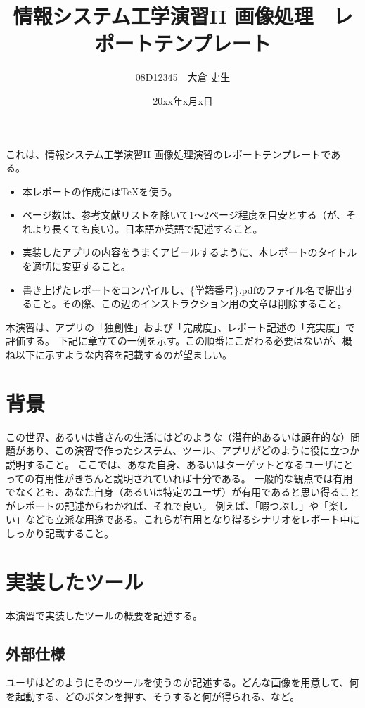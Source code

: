 \documentclass[twocolumn, a4paper]{jsarticle}
\begin{document}
\title{情報システム工学演習II 画像処理　レポートテンプレート}
\author{08D12345　大倉 史生}
\date{20xx年x月x日} 
\twocolumn[
\maketitle
]

これは、情報システム工学演習II 画像処理演習のレポートテンプレートである。
\begin{itemize}
\item 本レポートの作成には\TeX を使う。
\item ページ数は、参考文献リストを除いて1～2ページ程度を目安とする（が、それより長くても良い）。日本語か英語で記述すること。
\item 実装したアプリの内容をうまくアピールするように、本レポートのタイトルを適切に変更すること。
\item 書き上げたレポートをコンパイルし、\{学籍番号\}.pdfのファイル名で提出すること。その際、この辺のインストラクション用の文章は削除すること。
\end{itemize}
本演習は、アプリの「独創性」および「完成度」、レポート記述の「充実度」で評価する。
下記に章立ての一例を示す。この順番にこだわる必要はないが、概ね以下に示すような内容を記載するのが望ましい。

\section{背景}
この世界、あるいは皆さんの生活にはどのような（潜在的あるいは顕在的な）問題があり、この演習で作ったシステム、ツール、アプリがどのように役に立つか説明すること。
ここでは、あなた自身、あるいはターゲットとなるユーザにとっての有用性がきちんと説明されていれば十分である。
一般的な観点では有用でなくとも、あなた自身（あるいは特定のユーザ）が有用であると思い得ることがレポートの記述からわかれば、それで良い。
例えば、「暇つぶし」や「楽しい」なども立派な用途である。これらが有用となり得るシナリオをレポート中にしっかり記載すること。

\section{実装したツール}
本演習で実装したツールの概要を記述する。

\subsection{外部仕様}
ユーザはどのようにそのツールを使うのか記述する。どんな画像を用意して、何を起動する、どのボタンを押す、そうすると何が得られる、など。
\end{document}

